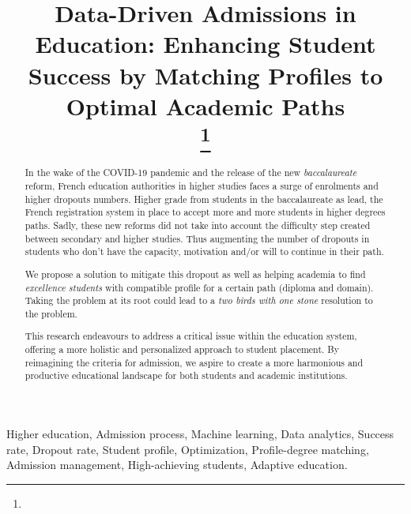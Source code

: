 \documentclass[conference]{IEEEtran}
\begin{document}
\title{Data-Driven Admissions in Education: Enhancing Student Success by Matching Profiles to Optimal Academic Paths\\
{\footnotesize \textsuperscript{}}
\thanks{}
}

\author{
}
\maketitle

\begin{abstract}
In the wake of the COVID-19 pandemic and the release of the new \textit{baccalaureate} reform, French education authorities in higher studies faces a surge of enrolments and higher dropouts numbers. Higher grade from students in the baccalaureate as lead, the French registration system in place to accept more and more students in higher degrees paths. Sadly, these new reforms did not take into account the difficulty step created between secondary and higher studies. Thus augmenting the number of dropouts in students who don't have the capacity, motivation and/or will to continue in their path. 

We propose a solution to mitigate this dropout as well as helping academia to find \textit{excellence students} with compatible profile for a certain path (diploma and domain). Taking the problem at its root could lead to a \textit{two birds with one stone} resolution to the problem.

This research endeavours to address a critical issue within the education system, offering a more holistic and personalized approach to student placement. By reimagining the criteria for admission, we aspire to create a more harmonious and productive educational landscape for both students and academic institutions. 
\end{abstract}
\vspace{8pt}
\begin{IEEEkeywords}
Higher education, Admission process, Machine learning, Data analytics, Success rate, Dropout rate, Student profile, Optimization, Profile-degree matching, Admission management, High-achieving students, Adaptive education.
\end{IEEEkeywords}
\vspace{16pt}
\end{document}
